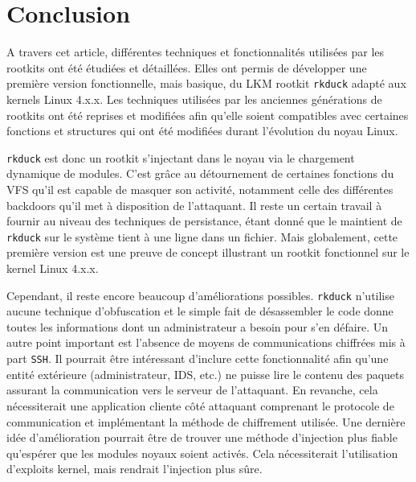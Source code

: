 \documentclass[12pt]{article}
\begin{document}
\section*{Conclusion}
    
	A travers cet article, différentes techniques et fonctionnalités utilisées par les rootkits ont été étudiées et détaillées. Elles ont permis de développer une première version fonctionnelle, mais basique, du LKM rootkit \texttt{rkduck} adapté aux kernels Linux 4.x.x. Les techniques utilisées par les anciennes générations de rootkits ont été reprises et modifiées afin qu'elle soient compatibles avec certaines fonctions et structures qui ont été modifiées durant l'évolution du noyau Linux. 
	
	\texttt{rkduck} est donc un rootkit s'injectant dans le noyau via le chargement dynamique de modules. C'est grâce au détournement de certaines fonctions du VFS qu'il est capable de masquer son activité, notamment celle des différentes backdoors qu'il met à disposition de l'attaquant. Il reste un certain travail à fournir au niveau des techniques de persistance, étant donné que le maintient de \texttt{rkduck} sur le système tient à une ligne dans un fichier. Mais globalement, cette première version est une preuve de concept illustrant un rootkit fonctionnel sur le kernel Linux 4.x.x.
	
	Cependant, il reste encore beaucoup d'améliorations possibles. \texttt{rkduck} n'utilise aucune technique d'obfuscation et le simple fait de désassembler le code donne toutes les informations dont un administrateur a besoin pour s'en défaire. Un autre point important est l'absence de moyens de communications chiffrées mis à part \texttt{SSH}. Il pourrait être intéressant d'inclure cette fonctionnalité afin qu'une entité extérieure (administrateur, IDS, etc.) ne puisse lire le contenu des paquets assurant la communication vers le serveur de l'attaquant. En revanche, cela nécessiterait une application cliente côté attaquant comprenant le protocole de communication et implémentant la méthode de chiffrement utilisée. Une dernière idée d'amélioration pourrait être de trouver une méthode d'injection plus fiable qu'espérer que les modules noyaux soient activés. Cela nécessiterait l'utilisation d'exploits kernel, mais rendrait l'injection plus sûre.
\newpage
\end{document}
